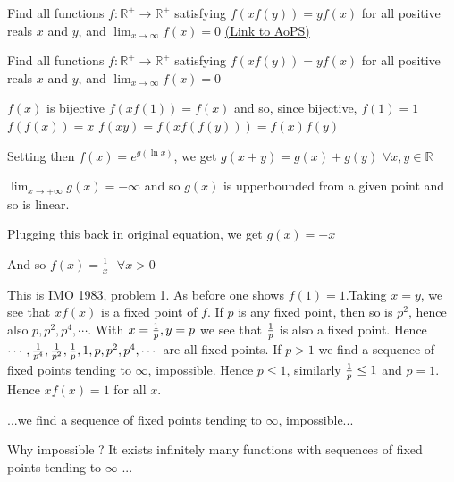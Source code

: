 \begin{problem}
	Find all functions $f:\mathbb{R}^+\to\mathbb{R}^+$ satisfying $f(xf(y))=yf(x)$ for all positive reals $x$ and $y$, and $\lim_{x\to\infty} f(x)=0$
	\flushright \href{https://artofproblemsolving.com/community/c6h1344999}{(Link to AoPS)}
\end{problem}



\begin{solution}
	\begin{tcolorbox}Find all functions $f:\mathbb{R}^+\to\mathbb{R}^+$ satisfying $f(xf(y))=yf(x)$ for all positive reals $x$ and $y$, and $\lim_{x\to\infty} f(x)=0$\end{tcolorbox}
$f(x)$ is bijective
$f(xf(1))=f(x)$ and so, since bijective, $f(1)=1$
$f(f(x))=x$
$f(xy)=f(xf(f(y)))=f(x)f(y)$

Setting then $f(x)=e^{g(\ln x)}$, we get $g(x+y)=g(x)+g(y)$ $\forall x,y\in\mathbb R$

$\lim_{x\to+\infty}g(x)=-\infty$ and so $g(x)$ is upperbounded from a given point and so is linear.

Plugging this back in original equation, we get $g(x)=-x$ 

And so $\boxed{f(x)=\frac 1x\text{  }\forall x>0}$
\end{solution}



\begin{solution}
	This is IMO 1983, problem 1. As before one shows $f(1)=1$.Taking $x=y$, we see that $xf(x)$ is a fixed  point
of $f$. If $p$ is any fixed point, then so is $p^2$, hence also $p,p^2,p^4,\cdots$. With $x={1\over p},y=p$ we see
that ${1\over p}$ is also a fixed point. Hence $\cdots,{1\over {p^4}},{1\over {p^2}},{1\over p},1,p,p^2,p^4,\cdots$
are all fixed points. If $p>1$ we find a sequence of fixed points tending to $\infty$, impossible.
Hence $p\le 1$, similarly ${1\over p}\le 1$ and $p=1$. Hence $xf(x)=1$ for all $x$.
\end{solution}



\begin{solution}
	\begin{tcolorbox}...we find a sequence of fixed points tending to $\infty$, impossible...\end{tcolorbox}
Why impossible ?
It exists infinitely many functions with sequences of fixed points tending to $\infty$ ...


\end{solution}



